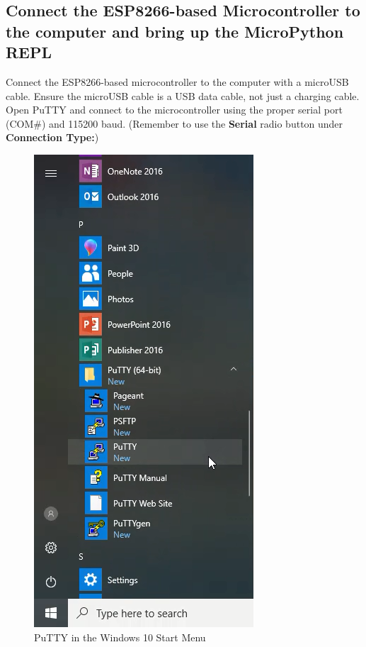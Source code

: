 \documentclass{book}
\makeatletter
\def\maxwidth{\ifdim\Gin@nat@width>\linewidth\linewidth
    \else\Gin@nat@width\fi}
\let\Oldincludegraphics\includegraphics
\renewcommand{\includegraphics}[1]{\Oldincludegraphics[width=.8\maxwidth]{#1}}
\makeatother
\begin{document}
    
        \subsection{Connect the ESP8266-based Microcontroller to the computer
and bring up the MicroPython
REPL}\label{connect-the-esp8266-based-microcontroller-to-the-computer-and-bring-up-the-micropython-repl}
    




    
        Connect the ESP8266-based microcontroller to the computer with a
microUSB cable. Ensure the microUSB cable is a USB data cable, not just
a charging cable. Open PuTTY and connect to the microcontroller using
the proper serial port (COM\#) and 115200 baud. (Remember to use the
\textbf{Serial} radio button under \textbf{Connection Type:})

\begin{figure}
\centering
\includegraphics{images/putty_in_start_menu.png}
\caption{PuTTY in the Windows 10 Start Menu}
\end{figure}
\end{document}
